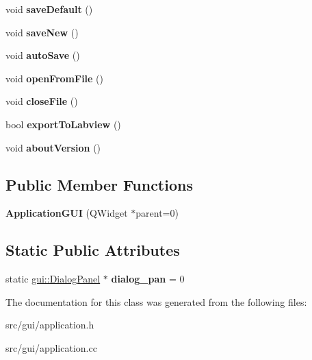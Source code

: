 \begin{DoxyCompactItemize}
\item 
void {\bfseries save\+Default} ()\hypertarget{classgui_1_1ApplicationGUI_af8925c11e2a195a4a7328167883e5881}{}\label{classgui_1_1ApplicationGUI_af8925c11e2a195a4a7328167883e5881}

\item 
void {\bfseries save\+New} ()\hypertarget{classgui_1_1ApplicationGUI_aeb9947805dc4a88a9560da3efc4b4dc9}{}\label{classgui_1_1ApplicationGUI_aeb9947805dc4a88a9560da3efc4b4dc9}

\item 
void {\bfseries auto\+Save} ()\hypertarget{classgui_1_1ApplicationGUI_a9b43f01157f1eb88d6849eab8d4839c6}{}\label{classgui_1_1ApplicationGUI_a9b43f01157f1eb88d6849eab8d4839c6}

\item 
void {\bfseries open\+From\+File} ()\hypertarget{classgui_1_1ApplicationGUI_a6b933a1d0010174100f2295d37359c34}{}\label{classgui_1_1ApplicationGUI_a6b933a1d0010174100f2295d37359c34}

\item 
void {\bfseries close\+File} ()\hypertarget{classgui_1_1ApplicationGUI_ac4ff5dbc38abd72e3aa255db9bf6f530}{}\label{classgui_1_1ApplicationGUI_ac4ff5dbc38abd72e3aa255db9bf6f530}

\item 
bool {\bfseries export\+To\+Labview} ()\hypertarget{classgui_1_1ApplicationGUI_a24f6f7f8bc9825a295ab04cf7fa90f25}{}\label{classgui_1_1ApplicationGUI_a24f6f7f8bc9825a295ab04cf7fa90f25}

\item 
void {\bfseries about\+Version} ()\hypertarget{classgui_1_1ApplicationGUI_a82e2a3da2b93ab15928e24d390eab9ac}{}\label{classgui_1_1ApplicationGUI_a82e2a3da2b93ab15928e24d390eab9ac}

\end{DoxyCompactItemize}
\subsection*{Public Member Functions}
\begin{DoxyCompactItemize}
\item 
{\bfseries Application\+G\+UI} (Q\+Widget $\ast$parent=0)\hypertarget{classgui_1_1ApplicationGUI_ae1edfa7cc2d5ced117d438179cc596e9}{}\label{classgui_1_1ApplicationGUI_ae1edfa7cc2d5ced117d438179cc596e9}

\end{DoxyCompactItemize}
\subsection*{Static Public Attributes}
\begin{DoxyCompactItemize}
\item 
static \hyperlink{classgui_1_1DialogPanel}{gui\+::\+Dialog\+Panel} $\ast$ {\bfseries dialog\+\_\+pan} = 0\hypertarget{classgui_1_1ApplicationGUI_af407ffb8205393913f9f980da2d6d2ed}{}\label{classgui_1_1ApplicationGUI_af407ffb8205393913f9f980da2d6d2ed}

\end{DoxyCompactItemize}


The documentation for this class was generated from the following files\+:\begin{DoxyCompactItemize}
\item 
src/gui/application.\+h\item 
src/gui/application.\+cc\end{DoxyCompactItemize}
